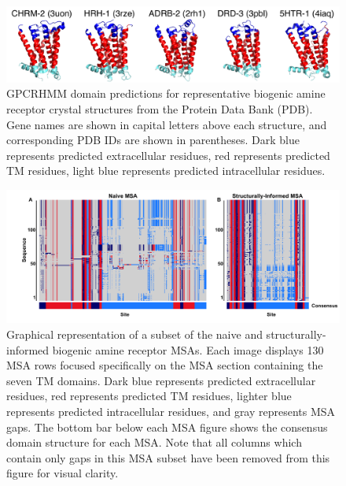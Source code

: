 \documentclass[fleqn,10pt]{wlpeerj}
\begin{document}
\newpage

\begin{figure}[htbp]
	\centerline{\includegraphics[width=15cm]{figures/pdb_gpcrhmm.pdf}}
	\caption{\label{pdb_gpcrhmm} GPCRHMM domain predictions for representative biogenic amine receptor crystal structures from the Protein Data Bank (PDB). Gene names are shown in capital letters above each structure, and corresponding PDB IDs are shown in parentheses. Dark blue represents predicted extracellular residues, red represents predicted TM residues, light blue represents predicted intracellular residues.}
\end{figure}



\vspace*{2cm}

\begin{figure}[htbp]
	\centerline{\includegraphics[width=8in]{figures/domains_naive_struc.png}}
	\caption{\label{domains} Graphical representation of a subset of the naive and structurally-informed biogenic amine receptor MSAs. Each image displays 130 MSA rows focused specifically on the MSA section containing the seven TM domains. Dark blue represents predicted extracellular residues, red represents predicted TM residues, lighter blue represents predicted intracellular residues, and gray represents MSA gaps. The bottom bar below each MSA figure shows the consensus domain structure for each MSA. Note that all columns which contain only gaps in this MSA subset have been removed from this figure for visual clarity.}
\end{figure}


\newpage
\end{document}
